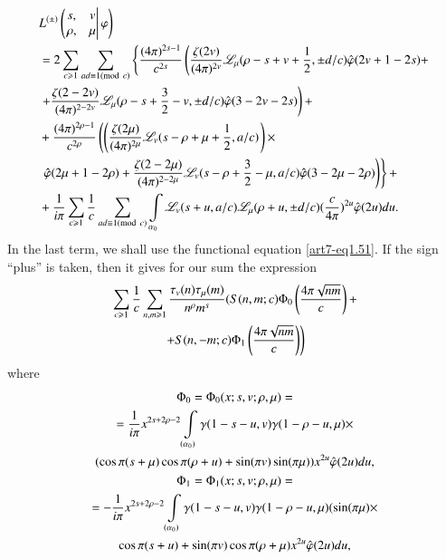 {\fontsize{10}{12}\selectfont
\begin{align}
& L^{(\pm)} 
\left( 
\left. 
\begin{matrix}
s, & v \\
\rho, & \mu 
\end{matrix}
\right| \varphi 
\right)\label{art7-eq3.5}\\
& = 2 \sum\limits_{c \geqslant 1} \sum\limits_{ad \equiv 1 ({\rm{mod}}\kern.3em c)} \left\{\frac{(4\pi)^{2s-1}}{c^{2s}} \left(\frac{\zeta (2v)}{(4\pi)^{2v}} \mathscr{L}_\mu (\rho - s+ v + \frac{1}{2}, \pm d/c) \hat{\varphi} (2v+ 1-2s) + \right. \right. \notag\\
& \left. + \frac{\zeta (2-2v)}{(4\pi)^{2-2v}} \mathscr{L}_\mu (\rho -s + \frac{3}{2} -v, \pm d/c) \hat{\varphi} (3-2v-2s)  \right) +\notag\\
& + \frac{(4\pi)^{2\rho-1}}{c^{2\rho}} \left(\left(\frac{\zeta (2\mu)}{(4\pi)^{2\mu}} \mathscr{L}_v  (s-\rho + \mu + \frac{1}{2}, a/c) \right. \right) \times 
\notag\\
&\left.\left. \hat{\varphi} (2\mu+ 1-2\rho) + \frac{\zeta(2-2\mu)}{(4\pi)^{2-2\mu}} \mathscr{L}_v (s-\rho + \frac{3}{2} -\mu, a/c) \hat{\varphi} (3-2\mu-2\rho) \right)\right\}  + \notag\\
&+  \frac{1}{i\pi} \sum\limits_{c \geqslant 1} \frac{1}{c} \sum\limits_{ad \equiv 1 ({\rm{mod}}\kern.3em c)} \int\limits_{\alpha_0} \mathscr{L}_v (s+u, a/c) \mathscr{L}_\mu (\rho + u, \pm d/c) (\frac{c}{4\pi})^{2u} \hat{\varphi} (2u) du. \notag
\end{align}}\pageoriginale
In the last term, we shall use the functional equation \eqref{art7-eq1.51}. If the sign ``plus'' is taken, then it gives for our sum the expression
\begin{gather}
\sum\limits_{c \geqslant 1} \frac{1}{c} \sum\limits_{n, m \geqslant 1} \frac{\tau_v (n) \tau_\mu (m)}{n^\rho m^s} (S(n, m; c) \Phi_0 \left(\frac{4\pi \sqrt{nm}}{c} \right) + \label{art7-eq3.6}\\
\left. + S( n, -m; c) \Phi_1 \left(\frac{4\pi \sqrt{nm}}{c} \right) \right) \notag
\end{gather}
where 
\begin{gather}
\Phi_0 = \Phi_0 (x; s, v; \rho, \mu ) = \label{art7-eq3.7}\\
=\frac{1}{i\pi} x^{2s+ 2\rho-2} \int\limits_{(\alpha_0)} \gamma (1-s-u, v) \gamma (1-\rho - u, \mu) \times \notag\\
(\cos \pi (s+ \mu) \cos \pi (\rho + u) + \sin (\pi v) \sin (\pi \mu)) x^{2u } \hat{\varphi} (2u) du, \notag\\
\Phi_1 =\Phi_1 (x; s, v; \rho, \mu) = \label{art7-eq3.8}\\
= -\frac{1}{i\pi} x^{2s+ 2 \rho -2} \int\limits_{(\alpha_0)} \gamma (1-s-u, v) \gamma (1-\rho-u, \mu) (\sin (\pi \mu) \times \notag\\
\cos \pi( s+ u) + \sin (\pi v) \cos \pi (\rho + \mu) x^{2u} \hat{\varphi} (2u)   du, \notag
\end{gather}

